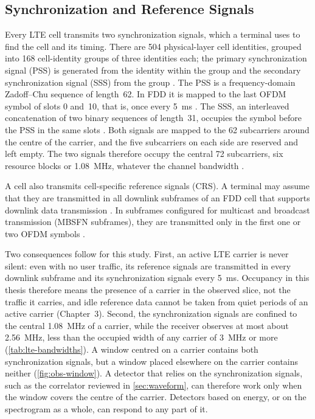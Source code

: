 \subsection{Synchronization and Reference Signals}
\label{sec:lte-sync}

Every LTE cell transmits two synchronization signals, which a terminal uses to find the cell and its timing. There are 504 physical-layer cell identities, grouped into 168 cell-identity groups of three identities each; the primary synchronization signal (PSS) is generated from the identity within the group and the secondary synchronization signal (SSS) from the group \parencite[clauses~6.11, 6.11.1.1 and 6.11.2.1]{3gpp2026a}. The PSS is a frequency-domain Zadoff--Chu sequence of length~62. In FDD it is mapped to the last OFDM symbol of slots 0 and~10, that is, once every \qty{5}{\milli\second} \parencite[clauses~6.11.1.1 and 6.11.1.2]{3gpp2026a}. The SSS, an interleaved concatenation of two binary sequences of length~31, occupies the symbol before the PSS in the same slots \parencite[clauses~6.11.2.1 and 6.11.2.2]{3gpp2026a}. Both signals are mapped to the 62 subcarriers around the centre of the carrier, and the five subcarriers on each side are reserved and left empty. The two signals therefore occupy the central 72 subcarriers, six resource blocks or \qty{1.08}{\mega\hertz}, whatever the channel bandwidth \parencite[clauses~6.11.1.2 and 6.11.2.2]{3gpp2026a}.

A cell also transmits cell-specific reference signals (CRS). A terminal may assume that they are transmitted in all downlink subframes of an FDD cell that supports downlink data transmission \parencite[clause~6.10.1]{3gpp2026a}. In subframes configured for multicast and broadcast transmission (MBSFN subframes), they are transmitted only in the first one or two OFDM symbols \parencite[clauses~6.1 and 6.10.1.2]{3gpp2026a}.

Two consequences follow for this study. First, an active LTE carrier is never silent: even with no user traffic, its reference signals are transmitted in every downlink subframe and its synchronization signals every \qty{5}{\milli\second}. Occupancy in this thesis therefore means the presence of a carrier in the observed slice, not the traffic it carries, and idle reference data cannot be taken from quiet periods of an active carrier (Chapter~3). Second, the synchronization signals are confined to the central \qty{1.08}{\mega\hertz} of a carrier, while the receiver observes at most about \qty{2.56}{\mega\hertz}, less than the occupied width of any carrier of \qty{3}{\mega\hertz} or more (\cref{tab:lte-bandwidths}). A window centred on a carrier contains both synchronization signals, but a window placed elsewhere on the carrier contains neither (\cref{fig:obs-window}). A detector that relies on the synchronization signals, such as the correlator reviewed in \cref{sec:waveform}, can therefore work only when the window covers the centre of the carrier. Detectors based on energy, or on the spectrogram as a whole, can respond to any part of it.

